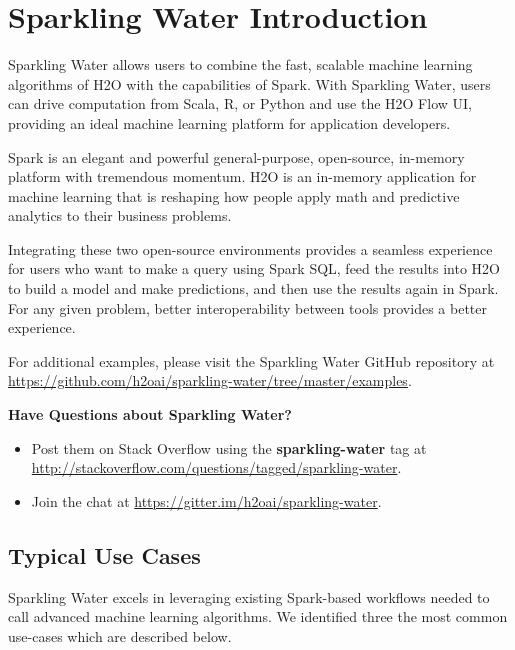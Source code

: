 \documentclass{standalone}
\begin{document}
\section{Sparkling Water Introduction}

Sparkling Water allows users to combine the fast, scalable machine learning algorithms of H2O with the capabilities of Spark. With Sparkling Water, users can drive computation from Scala, R, or Python and use the H2O Flow UI, providing an ideal machine learning platform for application developers.

Spark is an elegant and powerful general-purpose, open-source, in-memory platform with tremendous momentum. H2O is an in-memory application for machine learning that is reshaping how people apply math and predictive analytics to their business problems.

Integrating these two open-source environments provides a seamless experience for users who want to make a query using Spark SQL, feed the results into H2O to build a model and make predictions, and then use the results again in Spark. For any given problem, better interoperability between tools provides a better experience. 

For additional examples, please visit the Sparkling Water GitHub repository at {\url{https://github.com/h2oai/sparkling-water/tree/master/examples}}.

\begin{minipage}{\textwidth}
    \textbf{Have Questions about Sparkling Water?}
    \setlength{\parskip}{1em}
    \begin{itemize}
        \setlength\itemsep{1pt}
        \item Post them on Stack Overflow using the \textbf{sparkling-water} tag at {\url{http://stackoverflow.com/questions/tagged/sparkling-water}}.
        \item Join the chat at {\url{https://gitter.im/h2oai/sparkling-water}}.
    \end{itemize}
\end{minipage}

\subsection{Typical Use Cases}
Sparkling Water excels in leveraging existing Spark-based workflows needed to call advanced machine learning algorithms. We identified three the most common use-cases which are described below. 
\end{document}
